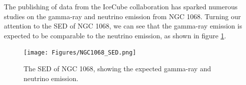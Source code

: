 The publishing of data from the IceCube collaboration \citep{IceCube2022} has sparked numerous studies on the gamma-ray and neutrino emission from NGC 1068. Turning our attention to the SED of NGC 1068, we can see that the gamma-ray emission is expected to be comparable to the neutrino emission, as shown in figure \ref{fig:NGC1068_SED}.
\begin{figure}[H]
    \centering
    \texttt{[image: Figures/NGC1068\_SED.png]}
    \caption{The SED of NGC 1068, showing the expected gamma-ray and neutrino emission.}
    \label{fig:NGC1068_SED}











\end{figure}
